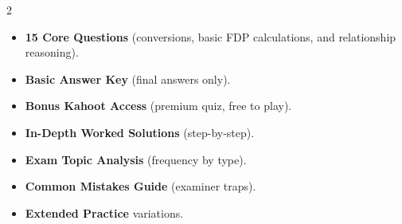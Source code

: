 \documentclass[11pt,a4paper]{article}
\newcommand{\FullReleaseDate}{April 30, 2026}
\begin{document}
\vspace{8pt}

\begin{multicols}{2}
  \begin{tcolorbox}[card, title=\sffamily\bfseries\textcolor{white}{\faHandPointDown\ TODAY (Simplified Version)}, colbacktitle=mainblue, boxed title style={sharp corners, boxrule=0pt}]
    \begin{itemize}[leftmargin=1.2em, itemsep=2pt]
      \item \small \textbf{15 Core Questions} (conversions, basic FDP calculations, and relationship reasoning).
      \item \small \textbf{Basic Answer Key} (final answers only).
      \item \small \textbf{Bonus Kahoot Access} (premium quiz, free to play).
    \end{itemize}
  \end{tcolorbox}

  \columnbreak

  \begin{tcolorbox}[card, title=\sffamily\bfseries\textcolor{white}{\faRocket\ ON \FullReleaseDate\ (Full Upgrade)}, colbacktitle=mainblue, boxed title style={sharp corners, boxrule=0pt}]
    \begin{itemize}[leftmargin=1.2em, itemsep=2pt]
      \item \small \textbf{In-Depth Worked Solutions} (step-by-step).
      \item \small \textbf{Exam Topic Analysis} (frequency by type).
      \item \small \textbf{Common Mistakes Guide} (examiner traps).
      \item \small \textbf{Extended Practice} variations.
    \end{itemize}
  \end{tcolorbox}
\end{multicols}
\end{document}
